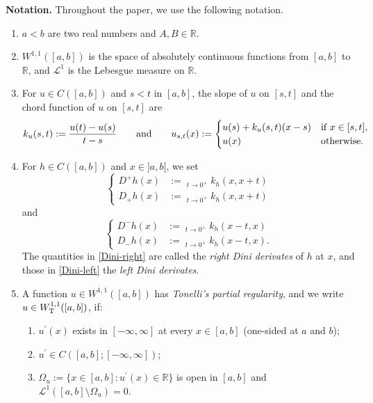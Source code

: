 \documentclass[reqno,12pt]{amsart}
\numberwithin{equation}{section}
\def\RR{{\mathds R}}
\def\limsup{\mathop{\overline{\lim}}}
\def\liminf{\mathop{\underline{\lim}}}
\theoremstyle{remark}
\begin{document}
\medskip

{\bf Notation.} Throughout the paper, we use the following notation.
\begin{enumerate}[labelindent=3em, leftmargin=2em, itemsep=0.6em, topsep=0.6em]
\item[$\bullet$] $a<b$ are two real numbers and $A,B\in\RR$.
\item[$\bullet$] $W^{1,1}([a,b])$ is the space of absolutely continuous functions from $[a,b]$ to $\RR$, and $\mathcal{L}^1$ is the Lebesgue measure on $\RR$.
\item[$\bullet$] For $u\in C([a,b])$ and $s<t$ in $[a,b]$, the slope of $u$ on $[s,t]$ and the chord function of $u$ on $[s,t]$ are
\begin{equation*}
k_u(s,t):=\frac{u(t)-u(s)}{t-s}\qquad\hbox{and}\qquad u_{s,t}(x):=\begin{cases}u(s)+k_u(s,t)(x-s)&\hbox{if }x\in[s,t],\\ u(x)&\hbox{otherwise.}\end{cases}
\end{equation*}
\item[$\bullet$] For $h\in C([a,b])$ and $x\in]a,b[$, we set
\begin{equation}\label{Dini-right}
\left\{\begin{aligned}
D^+h(x)&:=\limsup_{t\to0^+}k_h(x,x+t)\\
D_+h(x)&:=\liminf_{t\to0^+}k_h(x,x+t)
\end{aligned}\right.
\end{equation}
and
\begin{equation}\label{Dini-left}
\left\{\begin{aligned}
D^-h(x)&:=\limsup_{t\to0^+}k_h(x-t,x)\\
D_-h(x)&:=\liminf_{t\to0^+}k_h(x-t,x).
\end{aligned}\right.
\end{equation}
The quantities in \eqref{Dini-right} are called the {\em right Dini derivates} of $h$ at $x$, and those in \eqref{Dini-left} the {\em left Dini derivates}.
\item[$\bullet$] A function $u\in W^{1,1}([a,b])$ has {\em Tonelli's partial regularity}, and we write $u\in W^{1,1}_{\rm T}([a,b])$, if:
\begin{enumerate}[label=(\alph*), leftmargin=2em, itemsep=0.2em, topsep=0.3em]
\item $u^\prime(x)$ exists in $[-\infty,\infty]$ at every $x\in[a,b]$ (one-sided at $a$ and $b$);
\item $u^\prime\in C([a,b];[-\infty,\infty])$;
\item $\Omega_u:=\{x\in[a,b]:u^\prime(x)\in\RR\}$ is open in $[a,b]$ and $\mathcal{L}^1([a,b]\setminus\Omega_u)=0$.
\end{enumerate}
\end{enumerate}
\end{document}
